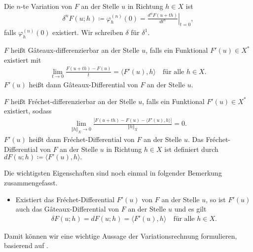 \begin{definition}[$n$-te Variation]
  Die $n$-te Variation von $F$ an der Stelle $u$ in Richtung $h\in X$ ist 
  \begin{align*}
    \delta^n F(u;h)\coloneqq \varphi_h^{(n)}(0)=
    \left. \frac{d^n F(u+th)}{dt^n}\right|_{t=0},
  \end{align*}
  falls $\varphi_h^{(n)}(0)$ existiert. Wir schreiben $\delta$ für $\delta^1$.
\end{definition}

\begin{definition}
  $F$ heißt G\^ateaux-differenzierbar an der Stelle $u$, falls ein 
  Funktional $F'(u)\in X^\ast$ existiert mit 
  \begin{align*}
    \lim_{t\to 0}\frac{F(u+th)-F(u)}{t} = \langle F'(u), h\rangle\quad
    \text{für alle } h\in X.
  \end{align*}
  $F'(u)$ heißt dann G\^ateaux-Differential von $F$ an der Stelle $u$.

  $F$ heißt Fr\'echet-differenzierbar an der Stelle $u$, falls ein Funktional
  $F'(u)\in X^\ast$ existiert, sodass
  \begin{align*}
    \lim_{\Vert h\Vert_X\to 0}\frac{|F(u+th)-F(u)-
    \langle F'(u),h\rangle|}{\Vert h\Vert_X} =0.
  \end{align*}
  $F'(u)$ heißt dann Fr\'echet-Differential von $F$ an der Stelle $u$.
  Das Fr\'echet-Differential von $F$ an der Stelle $u$ in Richtung $h\in X$
  ist definiert durch $dF(u;h)\coloneqq \langle F'(u),h\rangle.$
\end{definition}

Die wichtigsten Eigenschaften sind noch einmal in folgender Bemerkung 
zusammengefasst.

\begin{remark}
  \begin{itemize}
    \item Existiert das Fr\'echet-Differential $F'(u)$ von $F$ an der Stelle
      $u$, so ist $F'(u)$ auch das G\^ateaux-Differential von $F$ an der Stelle
      $u$ und es gilt 
      \begin{align*}
        \delta F(u;h)=dF(u;h)=\langle F'(u),h\rangle\quad\text{für alle } h\in
        X.
      \end{align*}
  \end{itemize}
\end{remark}

Damit können wir eine wichtige Aussage der Variationsrechnung formulieren,
basierend auf \cite[S. 193ff., Theorem 40.A, Theorem 40.B]{Zei85}.

